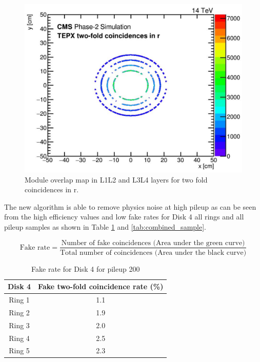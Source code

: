 \begin{figure}[!htp]
\centering
\includegraphics[width=1\textwidth]{ashish_thesis/l1l2_l3l4_2xinr.png}
\caption[L1L2 and L3L4 Module Overlap Map for Two Fold Coincidences in r]{%
   Module overlap map in L1L2 and L3L4 layers for two fold coincidences in r.
}
\label{fig:cluster_ring_79}
\end{figure}


\newpage
The new algorithm is able to remove physics noise at high pileup as can be seen from the high efficiency values and low fake rates for Disk 4 all rings and all pileup samples as shown in Table  \ref{tab:sample} and \ref{tab:combined_sample}.

\begin{equation}
\text{Fake rate} = \frac{\text{Number of fake coincidences (Area under the green curve)}}{\text{Total number of coincidences (Area under the black curve)}}
\end{equation}

\begin{table}[H]
  \centering
  \caption{Fake rate for Disk 4 for pileup 200}
  \begin{tabular}{cc}
    \textbf{Disk 4} & \textbf{Fake two-fold coincidence rate (\%)} \\
    \hline
    Ring 1 &  1.1\\
    Ring 2 &  1.9\\
    Ring 3 &  2.0\\
    Ring 4 &  2.5\\
    Ring 5 &  2.3\\
  \end{tabular}
  \label{tab:sample}
\end{table}

